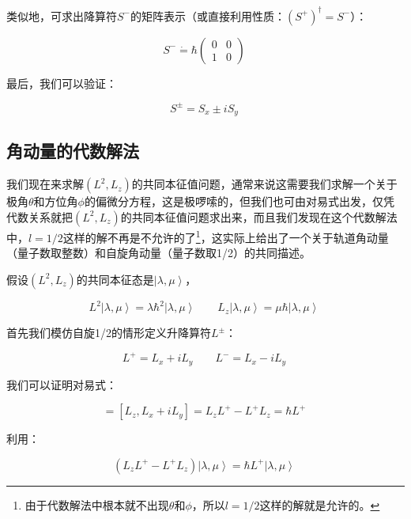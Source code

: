 类似地，可求出降算符$S^-$的矩阵表示（或直接利用性质：$\left( S^+ \right)^\dagger = S^-$）：

\begin{equation}
S^- \dot = \hbar \left(  \begin{array}{ccc}  0 &  0 \\  1 & 0  \end{array} \right)~
\end{equation}

最后，我们可以验证：

\begin{equation}
S^{\pm} = S_x \pm i S_y~
\end{equation}

\subsection{角动量的代数解法}

我们现在来求解$(L^2, L_z)$的共同本征值问题，通常来说这需要我们求解一个关于极角$\theta$和方位角$\phi$的偏微分方程，这是极啰嗦的，但我们也可由对易式出发，仅凭代数关系就把$(L^2, L_z)$的共同本征值问题求出来，而且我们发现在这个代数解法中，$l = 1/2$这样的解不再是不允许的了\footnote{由于代数解法中根本就不出现$\theta$和$\phi$，所以$l= 1/2$这样的解就是允许的。}，这实际上给出了一个关于轨道角动量（量子数取整数）和自旋角动量（量子数取1/2）的共同描述。

假设$(L^2, L_z)$的共同本征态是$\left| \lambda, \mu  \right\rangle$，

\begin{equation}
L^2 \left| \lambda, \mu \right\rangle = \lambda \hbar^2 \left| \lambda, \mu  \right\rangle \qquad
L_z \left| \lambda, \mu  \right\rangle = \mu \hbar \left| \lambda, \mu  \right\rangle~
\end{equation}


首先我们模仿自旋1/2的情形定义升降算符$L^{\pm}$：

\begin{equation}
L^+ = L_x + i L_y \qquad
L^- = L_x - i L_y ~
\end{equation}

我们可以证明对易式：

\begin{equation}
[ L_z, L^+ ] = [L_z, L_x + i L_y] = L_z L^+ - L^+ L_z = \hbar L^+~
\end{equation}

利用：

\begin{equation}
( L_z L^+ - L^+ L_z ) \left| \lambda, \mu  \right\rangle = \hbar L^+ \left| \lambda, \mu \right\rangle~
\end{equation}

